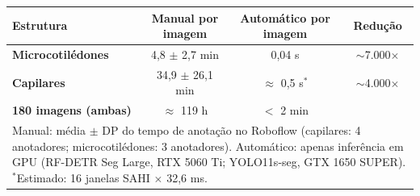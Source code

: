 \documentclass[border=12pt]{standalone}
\begin{document}
\begin{tabular}{l c c c}
\toprule
\textbf{Estrutura} & \textbf{Manual por imagem} & \textbf{Automático por imagem} & \textbf{Redução} \\
\midrule
\rowcolor{zebra}
\textbf{\color{micro}Microcotilédones} & 4,8 $\pm$ 2,7 min & 0,04 s & $\sim$7.000$\times$ \\
\textbf{\color{cap}Capilares} & 34,9 $\pm$ 26,1 min & $\approx$ 0,5 s$^{*}$ & $\sim$4.000$\times$ \\
\midrule
\rowcolor{zebra}
\textbf{180 imagens (ambas)} & $\approx$ 119 h & $<$ 2 min & \\
\bottomrule
\multicolumn{4}{p{13.2cm}}{\footnotesize Manual: média $\pm$ DP do tempo de anotação no Roboflow (capilares: 4 anotadores; microcotilédones: 3 anotadores). Automático: apenas inferência em GPU (RF-DETR Seg Large, RTX 5060 Ti; YOLO11s-seg, GTX 1650 SUPER). $^{*}$Estimado: 16 janelas SAHI $\times$ 32,6 ms.} \\
\end{tabular}
\end{document}
